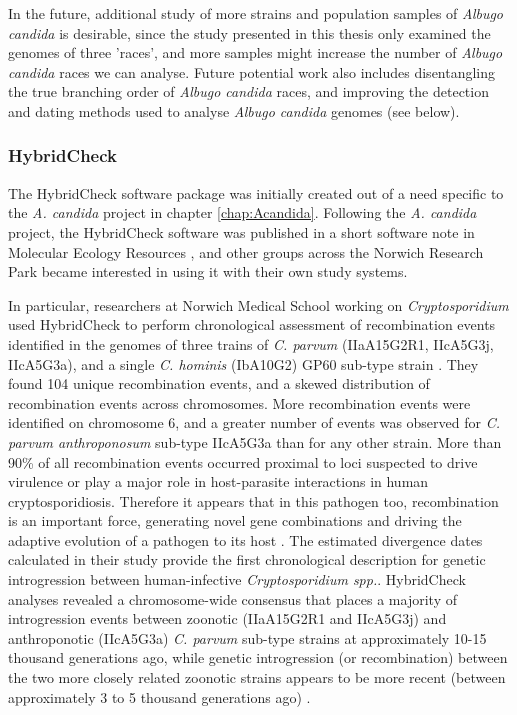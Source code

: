 In the future, additional study of more strains and population samples of \textit{Albugo candida} is desirable, since the study presented in this thesis only examined the genomes of three 'races', and more samples might increase the number of \textit{Albugo candida} races we can analyse.
Future potential work also includes disentangling the true branching order of \textit{Albugo candida} races, and improving the detection and dating methods used to analyse \textit{Albugo candida} genomes (see below).


\subsubsection{HybridCheck}

The HybridCheck software package was initially created out of a need specific to the \textit{A. candida} project in chapter \ref{chap:Acandida}.
Following the \textit{A. candida} project, the HybridCheck software was published in a short software note in Molecular Ecology Resources \parencite{Ward2016}, and other groups across the Norwich Research Park became interested in using it with their own study systems.

In particular, researchers at Norwich Medical School working on \textit{Cryptosporidium} used HybridCheck to perform chronological assessment of recombination events identified in the genomes of  
three trains of \textit{C. parvum} (IIaA15G2R1, IIcA5G3j, IIcA5G3a), and a single \textit{C. hominis} (IbA10G2) GP60 sub-type strain \parencite{Nader}.
They found 104 unique recombination events, and a skewed distribution of recombination events across chromosomes.
More recombination events were identified on chromosome 6, and a greater number of events was observed for \textit{C. parvum anthroponosum} sub-type IIcA5G3a than for any other strain.
More than 90\% of all recombination events occurred proximal to loci suspected to drive virulence or play a major role in host-parasite interactions in human cryptosporidiosis.
Therefore it appears that in this pathogen too, recombination is an important force, generating novel gene combinations and driving the adaptive evolution of a pathogen to its host \parencite{Nader}.
The estimated divergence dates calculated in their study provide the first chronological description for genetic introgression between human-infective \textit{Cryptosporidium spp.}.
HybridCheck analyses revealed a chromosome-wide consensus that places a majority of introgression events between zoonotic (IIaA15G2R1 and IIcA5G3j) and anthroponotic (IIcA5G3a) \textit{C. parvum} sub-type strains at approximately 10-15 thousand generations ago, while genetic introgression (or recombination) between the two more closely related zoonotic strains appears to be more recent (between approximately 3 to 5 thousand generations ago) \parencite{Nader}.

